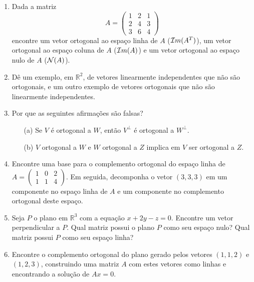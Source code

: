 \documentclass[12pt]{article}
\begin{document}
\begin{enumerate}
   \item Dada a matriz 
   $$A =
   \begin{pmatrix}
      1 & 2 & 1\\
      2 & 4 & 3\\
      3 & 6 & 4
   \end{pmatrix}
   $$
   encontre um vetor ortogonal ao espaço linha de $A$ (${\cal{I}}m(A^T)$), um vetor ortogonal ao espaço coluna de $A$ (${\cal{I}}m(A)$) e um vetor ortogonal ao espaço nulo de $A$ (${\cal{N}}(A)$).

   \item Dê um exemplo, em $\mathbb{R}^2$, de vetores linearmente independentes que não são ortogonais, e um outro exemplo de vetores ortogonais que não são linearmente independentes.

   \item Por que as seguintes afirmações são falsas?
   \begin{itemize}
      \item[(a)] Se $V$ é ortogonal a $W$, então $V^{\perp}$ é ortogonal a $W^{\perp}$.
      \item[(b)] $V$ ortogonal a $W$ e $W$ ortogonal a $Z$ implica em $V$ ser ortogonal a $Z$.
   \end{itemize}

   \item Encontre uma base para o complemento ortogonal do espaço linha de $A =
   \begin{pmatrix}
      1 & 0 & 2\\
      1 & 1 & 4
   \end{pmatrix}$.
   Em seguida, decomponha o vetor $(3,3,3)$ em um componente no espaço linha de $A$ e um componente no complemento ortogonal deste espaço.

   \item Seja $P$ o plano em $\mathbb{R}^3$ com a equação $x+2y-z=0$. Encontre um vetor perpendicular a $P$. Qual matriz possui o plano $P$ como seu espaço nulo? Qual matriz possui $P$ como seu espaço linha?

   \item Encontre o complemento ortogonal do plano gerado pelos vetores $(1,1,2)$ e $(1,2,3)$, construindo uma matriz $A$ com estes vetores como linhas e encontrando a solução de $Ax=0$. 


\end{enumerate}
\end{document}
